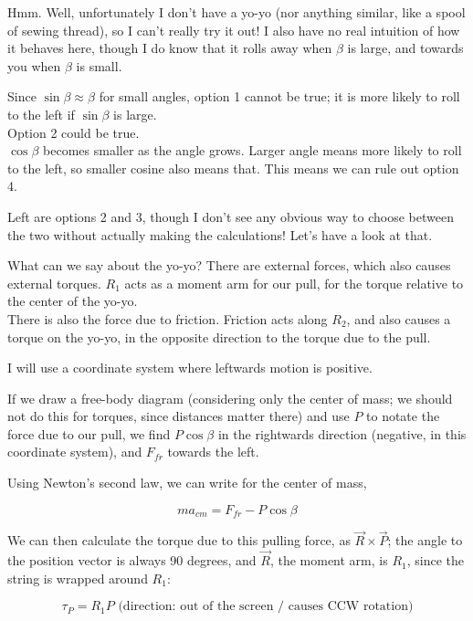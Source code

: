 \documentclass[8.01x]{subfiles}
\begin{document}
Hmm. Well, unfortunately I don't have a yo-yo (nor anything similar, like a spool of sewing thread), so I can't really try it out! I also have no real intuition of how it behaves here, though I do know that it rolls away when $\beta$ is large, and towards you when $\beta$ is small.

Since $\sin \beta \approx \beta$ for small angles, option 1 cannot be true; it is more likely to roll to the left if $\sin \beta$ is large.\\
Option 2 could be true.\\
$\cos \beta$ becomes smaller as the angle grows. Larger angle means more likely to roll to the left, so smaller cosine also means that. This means we can rule out option 4.

Left are options 2 and 3, though I don't see any obvious way to choose between the two without actually making the calculations! Let's have a look at that.

What can we say about the yo-yo? There are external forces, which also causes external torques. $R_1$ acts as a moment arm for our pull, for the torque relative to the center of the yo-yo.\\
There is also the force due to friction. Friction acts along $R_2$, and also causes a torque on the yo-yo, in the opposite direction to the torque due to the pull.

I will use a coordinate system where leftwards motion is positive.

If we draw a free-body diagram (considering only the center of mass; we should not do this for torques, since distances matter there) and use $P$ to notate the force due to our pull, we find $P \cos \beta$ in the rightwards direction (negative, in this coordinate system), and $F_{fr}$ towards the left.

Using Newton's second law, we can write for the center of mass,

\begin{equation}
m a_{cm} = F_{fr} - P \cos \beta
\end{equation}

We can then calculate the torque due to this pulling force, as $\vec{R} \times \vec{P}$; the angle to the position vector is always 90 degrees, and $\vec{R}$, the moment arm, is $R_1$, since the string is wrapped around $R_1$:

\begin{equation}
\tau_P = R_1 P \text{ (direction: out of the screen / causes CCW rotation)}
\end{equation}
\end{document}
